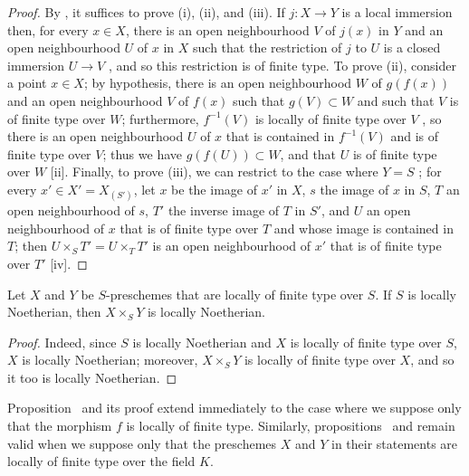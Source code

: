 \begin{proof}
By , it suffices to prove (i), (ii), and (iii).
If $j:X\to Y$ is a local immersion then, for every $x\in X$, there is an open neighbourhood $V$ of $j(x)$ in $Y$ and an open neighbourhood $U$ of $x$ in $X$ such that the restriction of $j$ to $U$ is a closed immersion $U\to V$ , and so this restriction is of finite type.
To prove (ii), consider a point $x\in X$;
by hypothesis, there is an open neighbourhood $W$ of $g(f(x))$ and an open neighbourhood $V$ of $f(x)$ such that $g(V)\subset W$ and such that $V$ is of finite type over $W$;
furthermore, $f^{-1}(V)$ is locally of finite type over $V$ , so there is an open neighbourhood $U$ of $x$ that is contained in $f^{-1}(V)$ and is of finite type over $V$;
thus we have $g(f(U))\subset W$, and that $U$ is of finite type over $W$ [ii].
Finally, to prove (iii), we can restrict to the case where $Y=S$ ;
for every $x'\in X'=X_{(S')}$, let $x$ be the image of $x'$ in $X$, $s$ the image of $x$ in $S$, $T$ an open neighbourhood of $s$, $T'$ the inverse image of $T$ in $S'$, and $U$ an open neighbourhood of $x$ that is of finite type over $T$ and whose image is contained in $T$;
then $U\times_S T'=U\times_T T'$ is an open neighbourhood of $x'$  that is of finite type over $T'$ [iv].
\end{proof}

\begin{corollary}[6.6.7]
\label{I.6.6.7}
Let $X$ and $Y$ be $S$-preschemes that are locally of finite type over $S$.
If $S$ is locally Noetherian, then $X\times_S Y$ is locally Noetherian.
\end{corollary}

\begin{proof}
Indeed, since $S$ is locally Noetherian and $X$ is locally of finite type over $S$, $X$ is locally Noetherian; moreover, $X\times_S Y$ is locally of finite type over $X$, and so it too is locally Noetherian.
\end{proof}

\begin{remark}[6.6.8]
\label{I.6.6.8}
Proposition~ and its proof extend immediately to the case where we suppose only that the morphism $f$ is locally of finite type.
Similarly, propositions~ and  remain valid when we suppose only that the preschemes $X$ and $Y$ in their statements are locally of finite type over the field $K$.
\end{remark}
